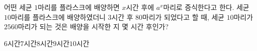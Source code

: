 어떤 세균 $1$마리를 플라스크에 배양하면 $x$시간 후에 $a^x$마리로 증식한다고 한다. 세균 $10$마리를 플라스크에 배양하였더니 $3$시간 후 $80$마리가 되었다고 할 때, 세균 $10$마리가 $2560$마리가 되는 것은 배양을 시작한 지 몇 시간 후인가? 
\begin{choices32}{$6$시간}{$7$시간}{$8$시간}{$9$시간}{$10$시간}\end{choices32}
